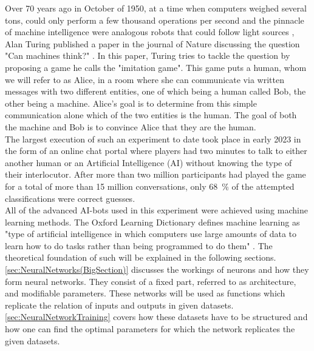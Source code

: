 Over 70 years ago in October of 1950, at a time when computers weighed several tons, could only perform a few thousand operations per second and the pinnacle of machine intelligence were analogous robots that could follow light sources \cite{FirstThinkingMachinesArticle}, Alan Turing published a paper in the journal of Nature discussing the question "Can machines think?" \cite{TuringThinkingPaper}. In this paper, Turing tries to tackle the question by proposing a game he calls the "imitation game". This game puts a human, whom we will refer to as Alice, in a room where she can communicate via written messages with two different entities, one of which being a human called Bob, the other being a machine. Alice's goal is to determine from this simple communication alone which of the two entities is the human. The goal of both the machine and Bob is to convince Alice that they are the human.\\
The largest execution of such an experiment to date took place in early 2023 in the form of an online chat portal where players had two minutes to talk to either another human or an Artificial Intelligence (AI) without knowing the type of their interlocutor. After more than two million participants had played the game for a total of more than 15 million conversations, only \SI{68}{\percent} of the attempted classifications were correct guesses.\\
All of the advanced AI-bots used in this experiment were achieved using machine learning methods. The Oxford Learning Dictionary defines machine learning as "type of artificial intelligence in which computers use large amounts of data to learn how to do tasks rather than being programmed to do them" \cite{MLDefinition}. The theoretical foundation of such will be explained in the following sections.\\
\cref{sec:NeuralNetworks(BigSection)} discusses the workings of neurons and how they form neural networks. They consist of a fixed part, referred to as architecture, and modifiable parameters. These networks will be used as functions which replicate the relation of inputs and outputs in given datasets. \cref{sec:NeuralNetworkTraining} covers how these datasets have to be structured and how one can find the optimal parameters for which the network replicates the given datasets.
